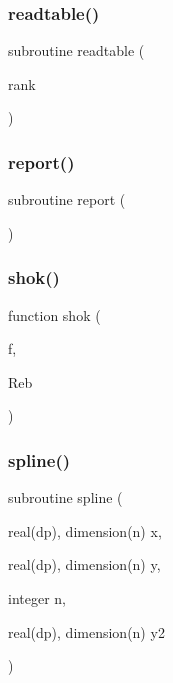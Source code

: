 \subsubsection{\texorpdfstring{readtable()}{readtable()}}
{\footnotesize\ttfamily subroutine readtable (\begin{DoxyParamCaption}\item[{}]{rank }\end{DoxyParamCaption})}

\mbox{\label{main__comp_8f_aa57d7f5bb62dee1fa46715ca0c57ec71}} 
\subsubsection{\texorpdfstring{report()}{report()}}
{\footnotesize\ttfamily subroutine report (\begin{DoxyParamCaption}{ }\end{DoxyParamCaption})}

\mbox{\label{main__comp_8f_a74177647a3929a8e8d9b3f9c5f755ebc}} 
\subsubsection{\texorpdfstring{shok()}{shok()}}
{\footnotesize\ttfamily function shok (\begin{DoxyParamCaption}\item[{}]{f,  }\item[{}]{Reb }\end{DoxyParamCaption})}

\mbox{\label{main__comp_8f_a27351a74d7ab14c93a1bedc697c2458f}} 
\subsubsection{\texorpdfstring{spline()}{spline()}}
{\footnotesize\ttfamily subroutine spline (\begin{DoxyParamCaption}\item[{real(dp), dimension(n)}]{x,  }\item[{real(dp), dimension(n)}]{y,  }\item[{integer}]{n,  }\item[{real(dp), dimension(n)}]{y2 }\end{DoxyParamCaption})}

